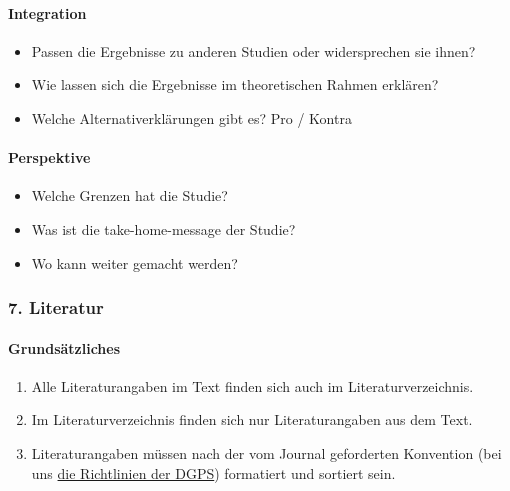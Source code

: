 \documentclass[
]{book}
\providecommand{\tightlist}{%
  \setlength{\itemsep}{0pt}\setlength{\parskip}{0pt}}
\begin{document}
\hypertarget{integration}{%
\paragraph{Integration}\label{integration}}

\begin{itemize}
\tightlist
\item
  Passen die Ergebnisse zu anderen Studien oder widersprechen sie ihnen?
\item
  Wie lassen sich die Ergebnisse im theoretischen Rahmen erklären?
\item
  Welche Alternativerklärungen gibt es? Pro / Kontra
\end{itemize}

\hypertarget{perspektive}{%
\paragraph{Perspektive}\label{perspektive}}

\begin{itemize}
\tightlist
\item
  Welche Grenzen hat die Studie?
\item
  Was ist die take-home-message der Studie?
\item
  Wo kann weiter gemacht werden?
\end{itemize}

\hypertarget{literatur-2}{%
\subsubsection{7. Literatur}\label{literatur-2}}

\hypertarget{grundsuxe4tzliches}{%
\paragraph{Grundsätzliches}\label{grundsuxe4tzliches}}

\begin{enumerate}
\def\labelenumi{\arabic{enumi}.}
\item
  Alle Literaturangaben im Text finden sich auch im Literaturverzeichnis.
\item
  Im Literaturverzeichnis finden sich nur Literaturangaben aus dem Text.
\item
  Literaturangaben müssen nach der vom Journal geforderten Konvention (bei uns \href{https://elibrary.hogrefe.de/book/99.110005/9783840927638}{die Richtlinien der DGPS}) formatiert und sortiert sein.
\end{enumerate}
\end{document}
